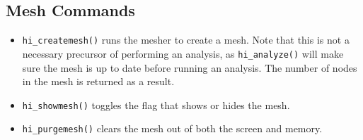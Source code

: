 \subsection{Mesh Commands}

\begin{itemize}
\item \texttt{hi\_createmesh()} runs the mesher to create a mesh. Note that this is not
a necessary precursor of performing an analysis, as
\texttt{hi\_analyze()} will make sure the mesh is up to date before
running an analysis. The number of nodes in the mesh is returned as a
result.

\item \texttt{hi\_showmesh()} toggles the flag that shows or hides the mesh.

\item \texttt{hi\_purgemesh()} clears the mesh out of both the screen and memory.
\end{itemize}

